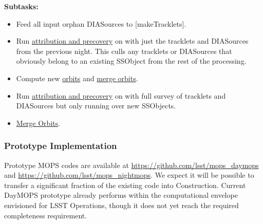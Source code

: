 {\bf Subtasks:}
\begin{itemize}
\item Feed all input orphan DIASources to \hyperref[sec:acMakeTracklets][makeTracklets].
\item Run \hyperref[sec:acAttributionAndPrecovery]{attribution and precovery} on with just the tracklets and DIASources from the previous night.  This culls any tracklets or DIASources that obviously belong to an existing SSObject from the rest of the processing.
\item Compute new \hyperref[sec:acOrbitFitting]{orbits} and \hyperref[sec:acOrbitMerging]{merge orbits}.
\item Run \hyperref[sec:acAttributionAndPrecovery]{attribution and precovery} on with full survey of tracklets and DIASources but only running over new SSObjects.
\item \hyperref[sec:acOrbitMerging]{Merge Orbits}.
\end{itemize}

\subsubsection{Prototype Implementation}

Prototype MOPS codes are available at
\url{https://github.com/lsst/mops_daymops} and
\url{https://github.com/lsst/mops_nightmops}. We expect it will be
possible to transfer a significant fraction of the existing code into
Construction. Current DayMOPS prototype already performs within the
computational envelope envisioned for LSST Operations, though it does
not yet reach the required completeness requirement.

